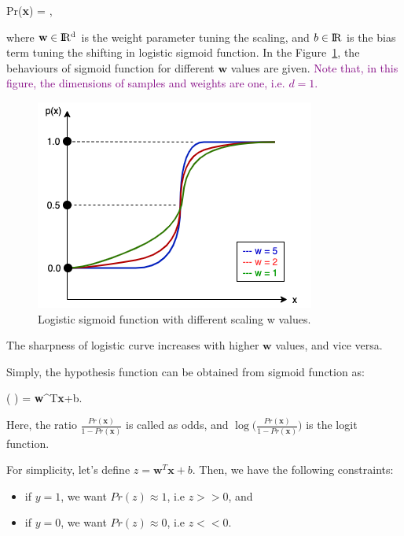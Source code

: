 \be
\label{eq:logistic_p}
Pr(\textbf{x}) = \:,
\ee

where $\textbf{w} \in \rm I\!R^{d}$ is the weight parameter tuning the scaling, and $b \in \rm I\!R$ is the bias term tuning the shifting in logistic sigmoid function. In the Figure~\ref{logistic_function}, the behaviours of sigmoid function for different $\textbf{w}$ values are given. \textcolor{purple}{Note that, in this figure, the dimensions of samples and weights are one, i.e. $d = 1$.}

\begin{figure}[h]
	\centering
	\includegraphics[width=.6\linewidth]{fig/logistic_function.png}
	\vspace*{2mm}
	\caption{Logistic sigmoid function with different scaling w values. }
	\label{logistic_function}
\end{figure}

The sharpness of logistic curve increases with higher $\textbf{w}$ values, and vice versa.

Simply, the hypothesis function can be obtained from sigmoid function as:

\be
\label{eq:logistic_hyptothesis}
\ln \Big ( \Big ) = \textbf{w}^{T}\textbf{x}+b\:.
\ee

Here, the ratio $\frac{Pr(\textbf{x})}{1 - Pr(\textbf{x})}$ is called as odds, and $\log \Big (\frac{Pr(\textbf{x})}{1 - Pr(\textbf{x})} \Big )$ is the logit function.

For simplicity, let's define $z = \textbf{w}^{T}\textbf{x}+b$. Then, we have the following constraints:

\begin{itemize}
    \item if $y = 1$, we want $Pr(z) \approx 1$, i.e $z >> 0$, and
    \item if $y = 0$, we want $Pr(z) \approx 0$, i.e $z << 0$.
\end{itemize}

